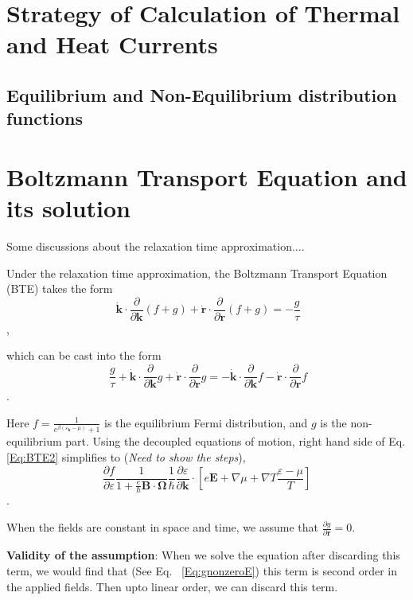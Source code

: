 \documentclass{revtex4-2}
\newcommand{\bvec}[1]{{\mathbf #1}}
\begin{document}
\section{Strategy of Calculation of Thermal and Heat Currents}
\subsection{Equilibrium and Non-Equilibrium distribution functions}
\section{Boltzmann Transport Equation and its solution}
Some discussions about the relaxation time approximation....

Under the relaxation time approximation, the Boltzmann Transport Equation (BTE) takes the form
\begin{equation}~\label{Eq:BTE}
\dot{\bvec{k}}\cdot\frac{\partial}{\partial \bvec{k}} (f + g) + \dot{\bvec{r}}\cdot\frac{\partial}{\partial \bvec{r}} (f + g) = -\frac{g}{\tau}
\end{equation},

which can be cast into the form
\begin{equation}~\label{Eq:BTE2}
	\frac{g}{\tau} + \dot{\bvec{k}}\cdot\frac{\partial}{\partial \bvec{k}} g + \dot{\bvec{r}}\cdot\frac{\partial}{\partial \bvec{r}} g = -\dot{\bvec{k}}\cdot\frac{\partial}{\partial \bvec{k}}f - \dot{\bvec{r}}\cdot\frac{\partial}{\partial \bvec{r}}f
\end{equation}.

Here $f = \frac{1}{e^{\beta(\varepsilon_{\bvec{k}} - \mu)} + 1}$ is the equilibrium Fermi distribution, and $g$ is the non-equilibrium part.
Using the decoupled equations of motion, right hand side of Eq. \eqref{Eq:BTE2} simplifies to (\textit{Need to show the steps}),
$$\frac{\partial f}{\partial \varepsilon}\frac{1}{1 + \frac{e}{\hbar} \bvec{B}\cdot\bvec{\Omega}}
\frac{1}{\hbar} \frac{\partial \varepsilon}{\partial \bvec{k}}\cdot\left[e \bvec{E} + \nabla{\mu} + \nabla T \frac{\varepsilon - \mu}{T}\right]
$$.

When the fields are constant in space and time, we assume that $\frac{\partial{g}}{\partial \bvec{r}} = 0$.

\textbf{Validity of the assumption}: When we solve the equation after discarding this term, we would find that (See Eq. ~\eqref{Eq:gnonzeroE}) this term is second order in the applied fields. Then upto linear order, we can discard this term.
\end{document}
